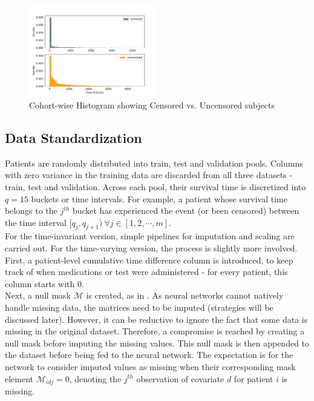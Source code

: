 \documentclass[%
 twocolumn,
 reprint,
 amsmath,amssymb,
 aps,nofootinbib
]{revtex4-2}
\begin{document}
\begin{figure}[H]
  \centering
  \includegraphics[width=0.5\textwidth]{cohort_hist.pdf}
  \caption[Cohort-wise Histogram]{Cohort-wise Histogram showing Censored vs. Uncensored subjects}
  \label{fig:cohort_hist}
\end{figure}

\subsection{\label{censoring}Data Standardization}
Patients are randomly distributed into train, test and validation pools. Columns with zero variance in the training data are discarded from all three datasets - train, test and validation. Across each pool, their survival time is discretized into $q=15$ buckets or time intervals. For example, a patient whose survival time belongs to the $j^{th}$ bucket has experienced the event (or been censored) between the time interval $[q_j, q_{j+1})\ \forall j \in [1,2,\cdots,m]$.\\

For the time-invariant version, simple pipelines for imputation and scaling are carried out. For the time-varying version, the process is slightly more involved. First, a patient-level cumulative time difference column is introduced, to keep track of when medications or test were administered - for every patient, this column starts with 0. \\

Next, a null mask $\mathcal{M}$ is created, as in \cite{deephit}. As neural networks cannot natively handle missing data, the matrices need to be imputed (strategies will be discussed later). However, it can be reductive to ignore the fact that some data is missing in the original dataset. Therefore, a compromise is reached by creating a null mask before imputing the missing values. This null mask is then appended to the dataset before being fed to the neural network. The expectation is for the network to consider imputed values as missing when their corresponding mask element $\mathcal{M}_{idj}=0$, denoting the $j^{th}$ observation of covariate $d$ for patient $i$ is missing.\\
\end{document}
